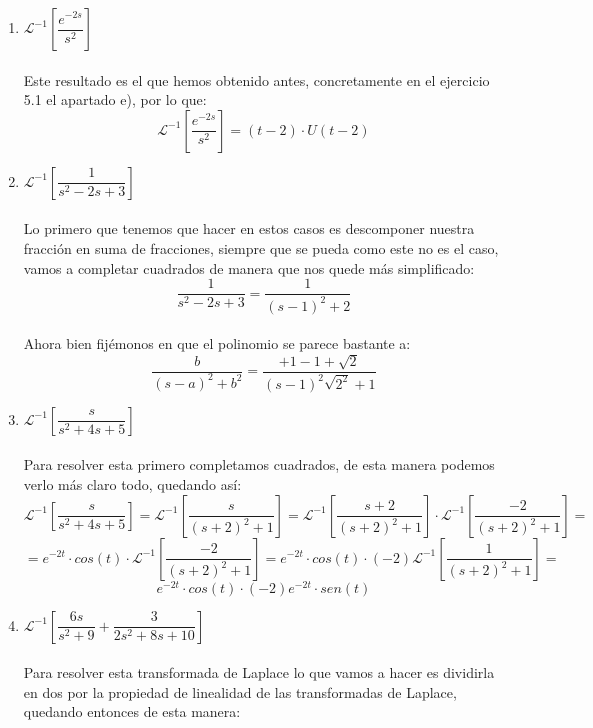 \documentclass[11pt]{article}
\def\Laplace#1{\mathscr{L}}%
\begin{document}
\begin{enumerate}[(i.)]
\item $\Laplace[^{-1}\left[\dfrac{e^{-2s}}{s^2}\right]$ \\
\\ Este resultado es el que hemos obtenido antes, concretamente en el ejercicio 5.1 el apartado e), por lo que:
$$\Laplace[^{-1}\left[\dfrac{e^{-2s}}{s^2}\right]=(t-2)\cdot U(t-2)$$
\item $\Laplace[^{-1}\left[\dfrac{1}{s^2-2s +3 }\right]$ \\ \\
Lo primero que tenemos que hacer en estos casos es descomponer nuestra 
fracción en suma de fracciones, siempre que se pueda como este no es el 
caso, vamos a completar cuadrados de manera que nos quede más simplificado:
$$\dfrac{1}{s^2-2s+3}=\dfrac{1}{(s-1)^2+2}$$
\\ Ahora bien fijémonos en que el polinomio se parece bastante a:
$$\dfrac{b}{(s-a)^2+b^2}= \dfrac{ +1-1+\sqrt{2}}{(s-1)^2\sqrt{2^2}+1}$$
\clearpage
\item $\Laplace[^{-1}\left[\dfrac{s}{s^2+4s+5}\right]$ \\ \\
Para resolver esta primero completamos cuadrados, de esta manera podemos verlo más claro todo, quedando así:
$$\Laplace[^{-1}\left[\dfrac{s}{s^2+4s+5}\right]= \Laplace[^{-1}\left[\dfrac{s}{(s+2)^2+1}\right]=\Laplace[^{-1}\left[\dfrac{s+2}{(s+2)^2+1}\right]\cdot\Laplace[^{-1}\left[\dfrac{-2}{(s+2)^2+1}\right]=$$
$$=e^{-2t}\cdot cos(t) \cdot \Laplace[^{-1}\left[\dfrac{-2}{(s+2)^2+1}
\right]=e^{-2t}\cdot cos(t) \cdot (-2)\Laplace[^{-1}\left[\dfrac{1}{(s+2)^2+1}\right]=$$
$$e^{-2t}\cdot cos(t) \cdot (-2)e^{-2t}\cdot sen(t)$$
\item $\Laplace[^{-1}\left[\dfrac{6s}{s^2+9}+\dfrac{3}{2s^2+8s+10}\right]$ \
\ \\
\\ Para resolver esta transformada de Laplace lo que vamos a hacer es dividirla 
en dos por la propiedad de linealidad de las transformadas de Laplace, 
quedando entonces de esta manera:
\begin{center}



\end{center}
\end{enumerate}
\end{document}
